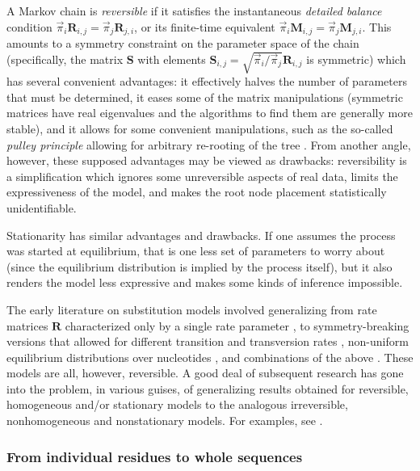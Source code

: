 \documentclass{bmcart}
\newcommand{\matr}[1]{\mathbf{#1}}
\newcommand{\ratematrix}{\matr{R}}
\newcommand{\eqmvec}{\vec{\pi}}
\newcommand{\condmatrix}{\matr{M}}
\begin{document}
A Markov chain is {\em reversible} if it satisfies the instantaneous {\em detailed balance} condition
$\eqmvec_i \ratematrix_{i,j} = \eqmvec_j \ratematrix_{j,i}$,
or its finite-time equivalent
$\eqmvec_i \condmatrix_{i,j} = \eqmvec_j \condmatrix_{j,i}$.
This amounts to a symmetry constraint on the parameter space of the chain
(specifically, the matrix $\matr{S}$ with elements $\matr{S}_{i,j} = \sqrt{\eqmvec_i / \eqmvec_j} \ratematrix_{i,j}$ is symmetric)
which has several convenient advantages: it effectively halves the number of parameters that must be
determined, it eases some of the matrix manipulations (symmetric matrices have real eigenvalues
and the algorithms to find them are generally more stable),
and it allows for some convenient manipulations, such as the so-called
{\em pulley principle} allowing for arbitrary re-rooting of the tree \cite{Felsenstein81}.
From another angle, however, these supposed advantages may be viewed as drawbacks:
reversibility is a simplification which ignores some unreversible aspects of real data,
limits the expressiveness of the model, and makes the root node placement statistically unidentifiable.

Stationarity has similar advantages and drawbacks.
If one assumes the process was started at equilibrium, that is one less set of parameters to worry about
(since the equilibrium distribution is implied by the process itself), but it also renders the model
less expressive and makes some kinds of inference impossible.

The early literature on substitution models involved generalizing from rate matrices $\ratematrix$
characterized only by a single rate parameter \cite{JukesCantor69},
to symmetry-breaking versions that allowed for different transition and transversion rates
 \cite{Kimura80}, non-uniform equilibrium distributions over nucleotides \cite{Felsenstein81},
and combinations of the above \cite{HasegawaEtal85}.
These models are all, however, reversible.
A good deal of subsequent research has gone into the problem, in various guises, of generalizing results obtained
for reversible, homogeneous and/or stationary models to the analogous irreversible, nonhomogeneous and nonstationary models.
For examples, see \cite{pmid9600890,pmid22644340,pmid15210317,pmid27774306}.

\subsubsection*{From individual residues to whole sequences}
\end{document}
